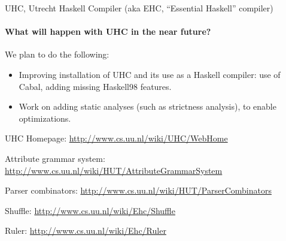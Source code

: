 \begin{hcarentry}{UHC, Utrecht Haskell Compiler (aka EHC, ``Essential Haskell'' compiler)}
\paragraph{What will happen with UHC in the near future?}
We plan to do the following:

\begin{itemize}
\item
  Improving installation of UHC and its use as a Haskell compiler: use of Cabal, adding missing Haskell98 features.
\item
  Work on adding static analyses (such as strictness analysis), to enable optimizations.
\end{itemize}

\FurtherReading
\begin{compactitem}
\item UHC Homepage:
\url{http://www.cs.uu.nl/wiki/UHC/WebHome}

\item Attribute grammar system:
\url{http://www.cs.uu.nl/wiki/HUT/AttributeGrammarSystem}

\item Parser combinators:
\url{http://www.cs.uu.nl/wiki/HUT/ParserCombinators}

\item Shuffle:
\url{http://www.cs.uu.nl/wiki/Ehc/Shuffle}

\item Ruler:
\url{http://www.cs.uu.nl/wiki/Ehc/Ruler}
\end{compactitem}
\end{hcarentry}
